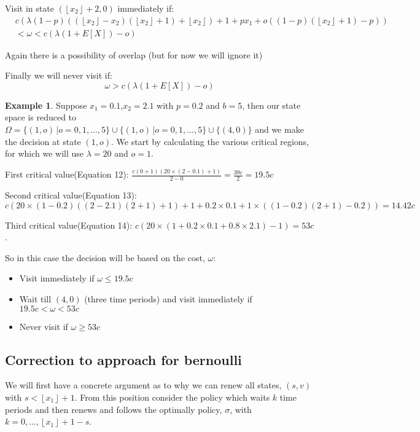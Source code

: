 \documentclass[a4paper,10pt]{article}
\newcommand{\floor}[1]{\left \lfloor #1 \right \rfloor}
\theoremstyle{definition}
\theoremstyle{definition}
\newtheorem{example}[theorem]{Example}
\theoremstyle{remark}
\theoremstyle{definition}
\begin{document}
Visit in state $(\floor{x_{2}}+2,0)$ immediately if:
\begin{align}
&c (\lambda (1-p)((\floor{x_{2}}-x_{2})(\floor{x_{2}}+1) + \floor{x_{2}}) + 1 +px_{1} +o((1-p)(\floor{x_{2}}+1)-p)) \nonumber \\
&< \omega < c(\lambda (1+E[X])-o)
\end{align}

Again there is a possibility of overlap (but for now we will ignore it)

Finally we will never visit if:
\begin{equation}
\omega > c(\lambda (1+E[X])-o)
\end{equation}


\begin{example}
Suppose $x_{1}=0.1$,$x_{2}=2.1$ with $p=0.2$ and $b=5$, then our state space is reduced to $\Omega= \{ (1,o) \, | o=0,1,...,5 \} \cup \{ (1,o) \, | o=0,1,...,5 \} \cup \{ (4,0) \}$ and we make the decision at state $(1,o)$. We start by calculating the various critical regions, for which we will use $\lambda=20$ and $o=1$.

First critical value(Equation 12): $\frac{c(0+1)(20 \times (2-0.1)+1)}{2-0}=\frac{39c}{2}=19.5c$

Second critical value(Equation 13): $c(20 \times (1-0.2)((2-2.1)(2+1)+1)+1+0.2 \times 0.1 + 1 \times ((1-0.2)(2+1)-0.2))=14.42c$

Third critical value(Equation 14): $c(20 \times (1+ 0.2 \times 0.1+0.8 \times 2.1)-1)=53c$.

So in this case the decision will be based on the cost, $\omega$:
\begin{itemize}
\item Visit immediately if $\omega \leq 19.5c$
\item Wait till $(4,0)$ (three time periods) and visit immediately if $19.5c <\omega < 53c$
\item Never visit if $\omega \geq 53c$
\end{itemize}
\end{example}

\subsection{Correction to approach for bernoulli}
We will first have a concrete argument as to why we can renew all states, $(s,v)$ with $s < \floor{x_{1}}+1$. From this position consider the policy which waits $k$ time periods and then renews and follows the optimally policy, $\sigma$, with $k=0,...,\floor{x_{1}}+1-s$.
\end{document}
